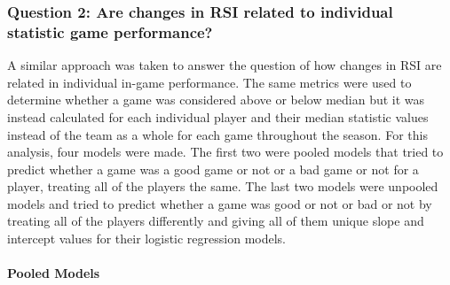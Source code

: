 \documentclass[
]{article}
\begin{document}
\subsubsection{Question 2: Are changes in RSI related to individual
statistic game
performance?}\label{question-2-are-changes-in-rsi-related-to-individual-statistic-game-performance}

A similar approach was taken to answer the question of how changes in
RSI are related in individual in-game performance. The same metrics were
used to determine whether a game was considered above or below median
but it was instead calculated for each individual player and their
median statistic values instead of the team as a whole for each game
throughout the season. For this analysis, four models were made. The
first two were pooled models that tried to predict whether a game was a
good game or not or a bad game or not for a player, treating all of the
players the same. The last two models were unpooled models and tried to
predict whether a game was good or not or bad or not by treating all of
the players differently and giving all of them unique slope and
intercept values for their logistic regression models.

\paragraph{Pooled Models}\label{pooled-models}
\end{document}
